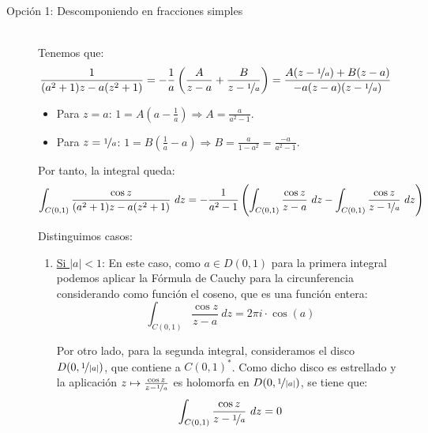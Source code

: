 \begin{ejercicio}
\begin{enumerate}
        \begin{description}
            \item [Opción 1: Descomponiendo en fracciones simples]~\\
                Tenemos que:
                \begin{align*}
                    \frac{1}{(a^2+1)z - a(z^2+1)} &= -\dfrac{1}{a}\left(\frac{A}{z-a} + \frac{B}{z-\nicefrac{1}{a}}\right) = \frac{A(z-\nicefrac{1}{a}) + B(z-a)}{-a(z-a)(z-\nicefrac{1}{a})}
                \end{align*}
                \begin{itemize}
                    \item Para $z=a$: $1=A\left(a-\frac{1}{a}\right)\Longrightarrow A=\frac{a}{a^2-1}$.
                    \item Para $z=\nicefrac{1}{a}$: $1=B\left(\frac{1}{a}-a\right)\Longrightarrow B=\frac{a}{1-a^2}=\frac{-a}{a^2-1}$.
                \end{itemize}

                Por tanto, la integral queda:
                \begin{align*}
                    \int_{C(0,1)} \frac{\cos z}{(a^2+1)z - a(z^2+1)}\ dz &= -\frac{1}{a^2-1}\left(\int_{C(0,1)} \frac{\cos z}{z-a}\ dz-\int_{C(0,1)} \frac{\cos z}{z-\nicefrac{1}{a}}\ dz\right)
                \end{align*}

                Distinguimos casos:
                \begin{enumerate}
                    \item \ul{Si $|a|<1$}: En este caso, como $a\in D(0,1)$ para la primera integral podemos aplicar la Fórmula de Cauchy para la circunferencia considerando como función el coseno, que es una función entera:
                    \begin{equation*}
                        \int_{C(0,1)} \frac{\cos z}{z-a}\ dz = 2\pi i \cdot \cos(a)
                    \end{equation*}

                    Por otro lado, para la segunda integral, consideramos el disco $D(0,\nicefrac{1}{|a|})$, que contiene a $C(0,1)^*$. Como dicho disco es estrellado y la aplicación $z\mapsto \frac{\cos z}{z-\nicefrac{1}{a}}$ es holomorfa en $D(0,\nicefrac{1}{|a|})$, se tiene que:
                    \begin{equation*}
                        \int_{C(0,1)} \frac{\cos z}{z-\nicefrac{1}{a}}\ dz = 0
                    \end{equation*}


\end{enumerate}
\end{description}
\end{enumerate}
\end{ejercicio}
